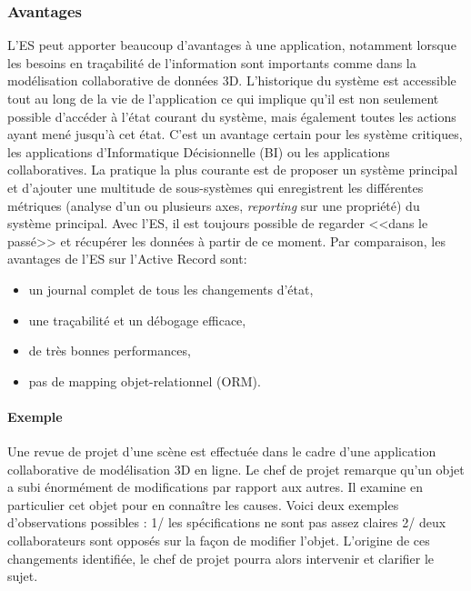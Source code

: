 \subsubsection{Avantages}
L'\gls{ES} peut apporter beaucoup d'avantages à une application, notamment 
lorsque les besoins en traçabilité de l'information sont importants comme dans 
la modélisation collaborative de données 3D.
L'historique du système est accessible tout au long de la vie de l'application ce 
qui implique qu'il est non seulement possible d'accéder à l'état courant du 
système, mais également toutes les actions ayant mené jusqu'à cet état. C'est 
un avantage certain pour les système critiques, les applications d'Informatique 
Décisionnelle (\gls{BI}) ou les applications collaboratives. La pratique la plus 
courante est de proposer un système principal et d'ajouter une multitude de 
sous-systèmes qui enregistrent les différentes métriques (analyse d'un ou 
plusieurs axes, \textit{reporting} sur une propriété) du système principal. Avec 
l'\gls{ES}, il est toujours possible de regarder <<dans le passé>> et récupérer 
les données à partir de ce moment. Par comparaison, les avantages de 
l'\gls{ES} sur l'Active Record sont:
\begin{itemize}
	\item un journal complet de tous les changements d'état,
	\item une traçabilité et un débogage efficace,
	\item de très bonnes performances,
	\item pas de mapping objet-relationnel (ORM).
\end{itemize}

	
\paragraph{Exemple} 
Une revue de projet d'une scène est effectuée dans le cadre d'une application 
collaborative de modélisation 3D en ligne. Le chef de projet remarque qu'un 
objet a subi énormément de modifications par rapport aux autres. Il examine en 
particulier cet objet pour en connaître les causes. Voici deux exemples 
d'observations possibles : 1/ les spécifications ne sont pas assez claires 2/ 
deux collaborateurs sont opposés sur la façon de modifier l'objet. L'origine de 
ces changements identifiée, le chef de projet pourra alors intervenir et clarifier 
le sujet. 

